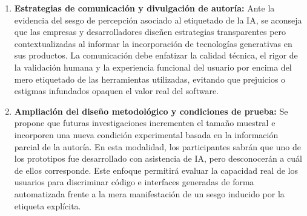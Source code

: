 \begin{enumerate}
    \item \textbf{Estrategias de comunicación y divulgación de autoría:} Ante la evidencia del sesgo de percepción asociado al etiquetado de la IA, se aconseja que las empresas y desarrolladores diseñen estrategias transparentes pero contextualizadas al informar la incorporación de tecnologías generativas en sus productos. La comunicación debe enfatizar la calidad técnica, el rigor de la validación humana y la experiencia funcional del usuario por encima del mero etiquetado de las herramientas utilizadas, evitando que prejuicios o estigmas infundados opaquen el valor real del software.
    \item \textbf{Ampliación del diseño metodológico y condiciones de prueba:} Se propone que futuras investigaciones incrementen el tamaño muestral e incorporen una nueva condición experimental basada en la información parcial de la autoría. En esta modalidad, los participantes sabrán que uno de los prototipos fue desarrollado con asistencia de IA, pero desconocerán a cuál de ellos corresponde. Este enfoque permitirá evaluar la capacidad real de los usuarios para discriminar código e interfaces generadas de forma automatizada frente a la mera manifestación de un sesgo inducido por la etiqueta explícita.
\end{enumerate}